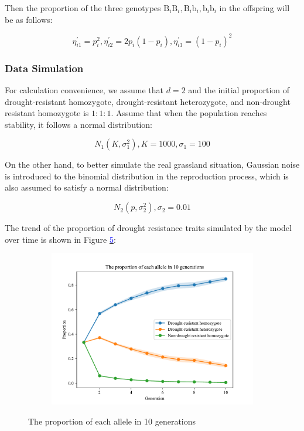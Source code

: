 \documentclass{mcmthesis}
\begin{document}
Then the proportion of the three genotypes $\mathrm{B}_i \mathrm{B}_i, \mathrm{B}_i \mathrm{b}_i, \mathrm{b}_i \mathrm{b}_i$ in the offspring will be as follows:

\begin{equation}
\eta_{i 1}^{\prime}=p_i^2, \eta_{i 2}^{\prime}=2 p_i\left(1-p_i\right), \eta_{i 3}^{\prime}=\left(1-p_i\right)^2
\end{equation}

\subsubsection{Data Simulation}

\indent

For calculation convenience, we assume that $d=2$ and the initial proportion of drought-resistant homozygote, drought-resistant heterozygote, and non-drought resistant homozygote is $1: 1: 1$. Assume that when the population reaches stability, it follows a normal distribution:

$$
N_1\left(K, \sigma_1^2\right), K=1000, \sigma_1=100
$$

On the other hand, to better simulate the real grassland situation, Gaussian noise is introduced to the binomial distribution in the reproduction process, which is also assumed to satisfy a normal distribution:

$$
N_2\left(p, \sigma_2^2\right), \sigma_2=0.01
$$

The trend of the proportion of drought resistance traits simulated by the model over time is shown in Figure \hyperref[fig:gene]{\textcolor{blue}{5}}:

\begin{figure}[h]
\centering
\begin{subfigure}{0.55 \textwidth}
\includegraphics[width=1\textwidth]{img/The proportion of each allele in 10 generations.pdf}
\end{subfigure}
\caption{The proportion of each allele in 10 generations}
\label{fig:gene}
\end{figure}
\end{document}

